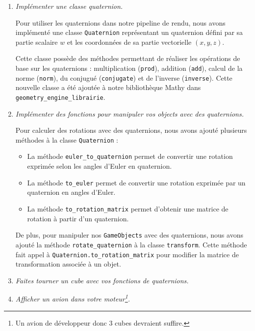 \documentclass[a4paper,12pt]{article}
\begin{document}
\begin{enumerate}
    \item \emph{Implémenter une classe quaternion.}

    Pour utiliser les quaternions dans notre pipeline de rendu, nous avons implémenté une classe \texttt{Quaternion} représentant un quaternion défini par sa partie scalaire $w$ et les coordonnées de sa partie vectorielle \((x, y, z)\). 
    
    Cette classe possède des méthodes permettant de réaliser les opérations de base sur les quaternions : multiplication (\texttt{prod}), addition (\texttt{add}), calcul de la norme (\texttt{norm}), du conjugué (\texttt{conjugate}) et de l'inverse (\texttt{inverse}).
    Cette nouvelle classe a été ajoutée à notre bibliothèque Mathy dans \texttt{geometry\_engine\_librairie}.

    \item \emph{Implémenter des fonctions pour manipuler vos objects avec des quaternions.}

    Pour calculer des rotations avec des quaternions, nous avons ajouté plusieurs méthodes à la classe \texttt{Quaternion} :
    \begin{itemize}
    \item La méthode \texttt{euler\_to\_quaternion} permet de convertir une rotation exprimée selon les angles d'Euler en quaternion.
    \item La méthode \texttt{to\_euler} permet de convertir une rotation exprimée par un quaternion en angles d'Euler.
    \item La méthode \texttt{to\_rotation\_matrix} permet d'obtenir une matrice de rotation à partir d'un quaternion.
    \end{itemize}

    De plus, pour manipuler nos \texttt{GameObjects} avec des quaternions, nous avons ajouté la méthode \texttt{rotate\_quaternion} à la classe \texttt{transform}. Cette méthode fait appel à \texttt{Quaternion.to\_rotation\_matrix} pour modifier la matrice de transformation associée à un objet.

    \item \emph{Faites tourner un cube avec vos fonctions de quaternions.}
    \item \emph{Afficher un avion dans votre moteur\footnote{Un avion de développeur donc 3 cubes devraient suffire.}.}
\end{enumerate}
\end{document}
